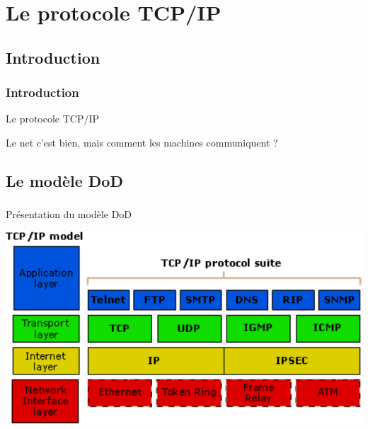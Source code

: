 




\section{Le protocole TCP/IP}
\subsection{Introduction}
\begin{frame}\frametitle{Introduction}
    {\Huge Le protocole TCP/IP}

    \vspace{2em}

    Le net c'est bien, mais comment les machines communiquent ?
\end{frame}


\subsection{Le modèle DoD}
\begin{frame}\frametitle{}
    {\Huge Présentation du modèle DoD}

    \includegraphics[scale=0.75]{res/DodModel.pdf}

\end{frame}


